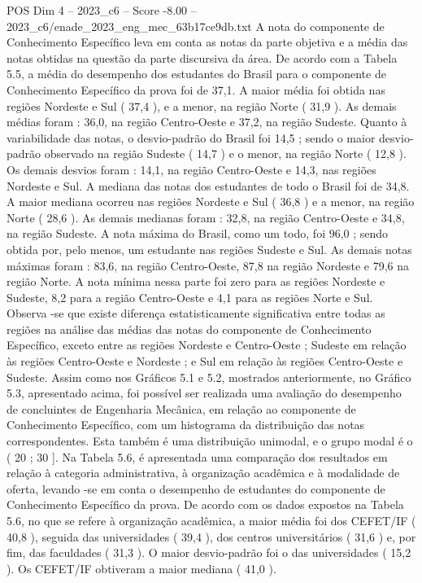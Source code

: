 \begin{textsample}{POS Dim 4 – 2023\_c6 – Score -8.00 – 2023\_c6/enade\_2023\_eng\_mec\_63b17ce9db.txt}
A nota do componente de Conhecimento Específico leva em conta as notas da parte objetiva e a média das notas obtidas na questão da parte discursiva da área.
De acordo com a Tabela 5.5, a média do desempenho dos estudantes do Brasil para o componente de Conhecimento Específico da prova foi de 37,1.
A maior média foi obtida nas regiões Nordeste e Sul ( 37,4 ), e a menor, na região Norte ( 31,9 ).
As demais médias foram : 36,0, na região Centro-Oeste e 37,2, na região Sudeste.
Quanto à variabilidade das notas, o desvio-padrão do Brasil foi 14,5 ; sendo o maior desvio-padrão observado na região Sudeste ( 14,7 ) e o menor, na região Norte ( 12,8 ).
Os demais desvios foram : 14,1, na região Centro-Oeste e 14,3, nas regiões Nordeste e Sul.
A mediana das notas dos estudantes de todo o Brasil foi de 34,8.
A maior mediana ocorreu nas regiões Nordeste e Sul ( 36,8 ) e a menor, na região Norte ( 28,6 ).
As demais medianas foram : 32,8, na região Centro-Oeste e 34,8, na região Sudeste.
A nota máxima do Brasil, como um todo, foi 96,0 ; sendo obtida por, pelo menos, um estudante nas regiões Sudeste e Sul.
As demais notas máximas foram : 83,6, na região Centro-Oeste, 87,8 na região Nordeste e 79,6 na região Norte.
A nota mínima nessa parte foi zero para as regiões Nordeste e Sudeste, 8,2 para a região Centro-Oeste e 4,1 para as regiões Norte e Sul.
Observa -se que existe diferença estatisticamente significativa entre todas as regiões na análise das médias das notas do componente de Conhecimento Específico, exceto entre as regiões Nordeste e Centro-Oeste ; Sudeste em relação às regiões Centro-Oeste e Nordeste ; e Sul em relação às regiões Centro-Oeste e Sudeste.
Assim como nos Gráficos 5.1 e 5.2, mostrados anteriormente, no Gráfico 5.3, apresentado acima, foi possível ser realizada uma avaliação do desempenho de concluintes de Engenharia Mecânica, em relação ao componente de Conhecimento Específico, com um histograma da distribuição das notas correspondentes.
Esta também é uma distribuição unimodal, e o grupo modal é o ( 20 ; 30 ].
Na Tabela 5.6, é apresentada uma comparação dos resultados em relação à categoria administrativa, à organização acadêmica e à modalidade de oferta, levando -se em conta o desempenho de estudantes do componente de Conhecimento Específico da prova.
De acordo com os dados expostos na Tabela 5.6, no que se refere à organização acadêmica, a maior média foi dos CEFET/IF ( 40,8 ), seguida das universidades ( 39,4 ), dos centros universitários ( 31,6 ) e, por fim, das faculdades ( 31,3 ).
O maior desvio-padrão foi o das universidades ( 15,2 ).
Os CEFET/IF obtiveram a maior mediana ( 41,0 ).

\end{textsample}
